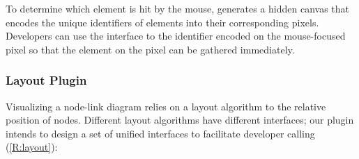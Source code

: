
    To determine which element is hit by the mouse,  \RenEng generates a hidden canvas that encodes the unique identifiers of elements into their corresponding pixels. Developers can use the interface  to  the identifier encoded on the mouse-focused pixel so that the element on the  pixel can be gathered immediately.


\subsubsection{Layout Plugin}


    Visualizing a node-link diagram relies on a layout algorithm to  the relative position of nodes. Different layout algorithms have different interfaces; our plugin intends to design a set of unified interfaces to facilitate developer calling (\ref{R:layout}):

